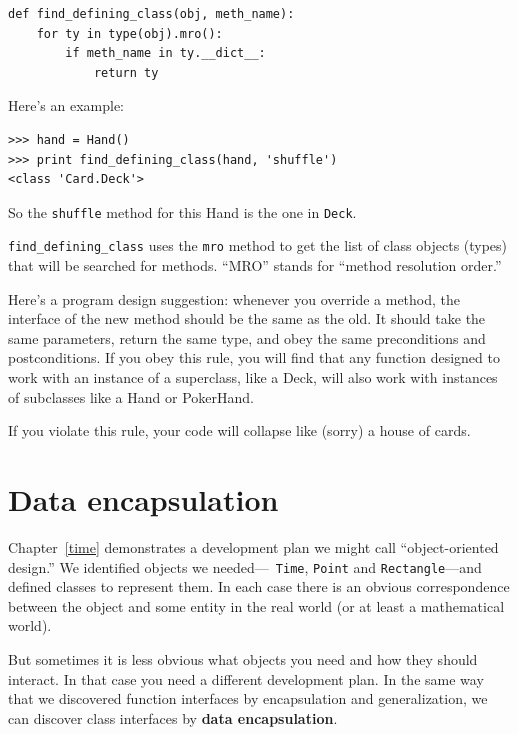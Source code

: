 \documentclass[10pt]{book}
\begin{document}
\begin{CJK}{UTF8}{gbsn}
\begin{verbatim}
def find_defining_class(obj, meth_name):
    for ty in type(obj).mro():
        if meth_name in ty.__dict__:
            return ty
\end{verbatim}
%
Here's an example:

\begin{verbatim}
>>> hand = Hand()
>>> print find_defining_class(hand, 'shuffle')
<class 'Card.Deck'>
\end{verbatim}
%
So the {\tt shuffle} method for this Hand is the one in {\tt Deck}.

\verb"find_defining_class" uses the {\tt mro} method to get the list
of class objects (types) that will be searched for methods.  ``MRO''
stands for ``method resolution order.''

Here's a program design suggestion: whenever you override a method,
the interface of the new method should be the same as the old.  It
should take the same parameters, return the same type, and obey the
same preconditions and postconditions.  If you obey this rule, you
will find that any function designed to work with an instance of a
superclass, like a Deck, will also work with instances of subclasses
like a Hand or PokerHand.

If you violate this rule, your code will collapse like (sorry)
a house of cards.


\section{Data encapsulation}

Chapter~\ref{time} demonstrates a development plan we might call
``object-oriented design.''  We identified objects we needed---{\tt
  Time}, {\tt Point} and {\tt Rectangle}---and defined classes to
represent them.  In each case there is an obvious correspondence
between the object and some entity in the real world (or at least a
mathematical world).

But sometimes it is less obvious what objects you need
and how they should interact.  In that case you need a different
development plan.  In the same way that we discovered function
interfaces by encapsulation and generalization, we can discover
class interfaces by {\bf data encapsulation}.


\end{CJK}
\end{document}
